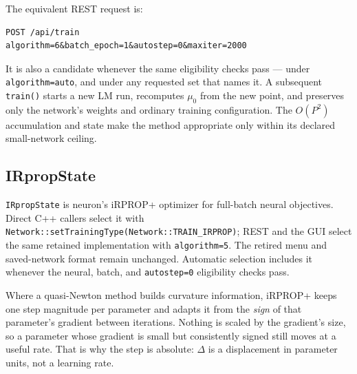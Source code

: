 The equivalent REST request is:
\begin{verbatim}
POST /api/train
algorithm=6&batch_epoch=1&autostep=0&maxiter=2000
\end{verbatim}
It is also a candidate whenever the same eligibility checks pass --- under
\texttt{algorithm=auto}, and under any requested set that names it. A subsequent \texttt{train()} starts a new LM run, recomputes
$\mu_0$ from the new point, and preserves only the network's weights and ordinary
training configuration. The $O(P^2)$ accumulation and state make the method
appropriate only within its declared small-network ceiling.

\subsection{IRpropState}
\texttt{IRpropState} is neuron's iRPROP+ optimizer for full-batch neural
objectives. Direct C++ callers select it with
\texttt{Network::setTrainingType(Network::TRAIN\_IRPROP)}; REST and the GUI
select the same retained implementation with \texttt{algorithm=5}. The retired
menu and saved-network format remain unchanged. Automatic selection includes it
whenever the neural, batch, and \texttt{autostep=0} eligibility checks pass.

Where a quasi-Newton method builds curvature information, iRPROP+ keeps one
step magnitude per parameter and adapts it from the \emph{sign} of that
parameter's gradient between iterations.  Nothing is scaled by the gradient's
size, so a parameter whose gradient is small but consistently signed still moves
at a useful rate.  That is why the step is absolute: $\Delta$ is a displacement
in parameter units, not a learning rate.

